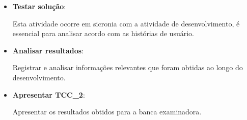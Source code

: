\begin{itemize}
  \item \textbf{Testar solução}:

    Esta atividade ocorre em sicronia com a atividade de desenvolvimento, é essencial para analisar acordo com as histórias de usuário.

  \item \textbf{Analisar resultados}:

    Registrar e analisar informações relevantes que foram obtidas ao longo do desenvolvimento.

  \item \textbf{Apresentar TCC\_2}:

    Apresentar os resultados obtidos para a banca examinadora.
\end{itemize}
